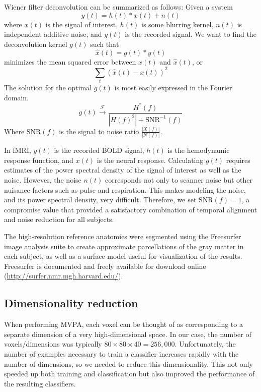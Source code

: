 \documentclass[preprint,5p,authoryear]{elsarticle}
\begin{document}
Wiener filter deconvolution can be summarized as follows:
Given a system
\begin{equation}
y(t) = h(t) \ast x(t) + n(t)
\end{equation}
where $x(t)$ is the signal of interest, $h(t)$ is some blurring kernel, $n(t)$ is independent additive noise, and $y(t)$ is the recorded signal.
We want to find the deconvolution kernel $g(t)$ such that 
\begin{equation}
\hat{x}(t) = g(t) \ast y(t)
\end{equation}
minimizes the mean squared error between $x(t)$ and $\hat{x}(t)$, or
\begin{equation}
\sum_{t}{\left( \hat{x}(t) - x(t) \right)^{2}}
\end{equation}
The solution for the optimal $g(t)$ is most easily expressed in the Fourier domain.
\begin{equation}
g(t) \xrightarrow{\mathcal{F}} \frac{H^{*}(f)}{\left|H(f)^{2}\right| + \mbox{SNR}^{-1}(f)}
\end{equation}
Where $\mbox{SNR}(f)$ is the signal to noise ratio $\frac{\left| X(f) \right|}{\left| N(f) \right|}$.


In fMRI, $y(t)$ is the recorded BOLD signal, $h(t)$ is the hemodynamic response function, and $x(t)$ is the neural response.
Calculating $g(t)$ requires estimates of the power spectral density of the signal of interest as well as the noise.
However, the noise $n(t)$ corresponds not only to scanner noise but other nuisance factors such as pulse and respiration.
This makes modeling the noise, and its power spectral density, very difficult.
Therefore, we set $\mbox{SNR}(f) = 1$, a compromise value that provided a satisfactory combination of temporal alignment and noise reduction for all subjects.

The high-resolution reference anatomies were segmented using the Freesurfer image analysis suite to create approximate parcellations of the gray matter in each subject, as well as a surface model useful for visualization of the results.
Freesurfer is documented and freely available for download online (\url{http://surfer.nmr.mgh.harvard.edu/}).

\subsection{Dimensionality reduction}
When performing MVPA, each voxel can be thought of as corresponding to a separate dimension of a very high-dimensional space.
In our case, the number of voxels/dimensions was typically $80 \times 80 \times 40 = 256,000$.
Unfortunately, the number of examples necessary to train a classifier increases rapidly with the number of dimensions, so we needed to reduce this dimensionality.
This not only speeded up both training and classification but also improved the performance of the resulting classifiers.
\end{document}
